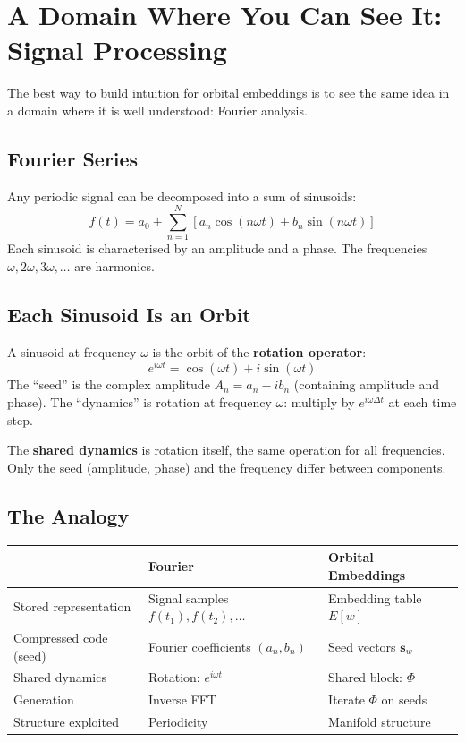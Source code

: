 \documentclass[11pt, a4paper]{article}
\newcommand{\s}{\mathbf{s}}
\theoremstyle{remark}
\begin{document}
\section{A Domain Where You Can See It: Signal Processing}
\label{sec:fourier}

The best way to build intuition for orbital embeddings is to see the same idea in a domain where it is well understood: Fourier analysis.

\subsection{Fourier Series}

Any periodic signal can be decomposed into a sum of sinusoids:
\[
    f(t) = a_0 + \sum_{n=1}^{N} \left[ a_n \cos(n\omega t) + b_n \sin(n\omega t) \right]
\]
Each sinusoid is characterised by an amplitude and a phase.
The frequencies $\omega, 2\omega, 3\omega, \ldots$ are harmonics.

\subsection{Each Sinusoid Is an Orbit}

A sinusoid at frequency $\omega$ is the orbit of the \textbf{rotation operator}:
\[
    e^{i\omega t} = \cos(\omega t) + i \sin(\omega t)
\]
The ``seed'' is the complex amplitude $A_n = a_n - i b_n$ (containing amplitude and phase).
The ``dynamics'' is rotation at frequency $\omega$: multiply by $e^{i\omega \Delta t}$ at each time step.

The \textbf{shared dynamics} is rotation itself, the same operation for all frequencies.
Only the seed (amplitude, phase) and the frequency differ between components.

\subsection{The Analogy}

\begin{center}\small
\begin{tabular}{@{}lll@{}}
\toprule
& \textbf{Fourier} & \textbf{Orbital Embeddings} \\
\midrule
Stored representation & Signal samples $f(t_1), f(t_2), \ldots$ & Embedding table $E[w]$ \\
Compressed code (seed) & Fourier coefficients $(a_n, b_n)$ & Seed vectors $\s_w$ \\
Shared dynamics & Rotation: $e^{i\omega t}$ & Shared block: $\Phi$ \\
Generation & Inverse FFT & Iterate $\Phi$ on seeds \\
Structure exploited & Periodicity & Manifold structure \\
\bottomrule
\end{tabular}
\end{center}
\end{document}
